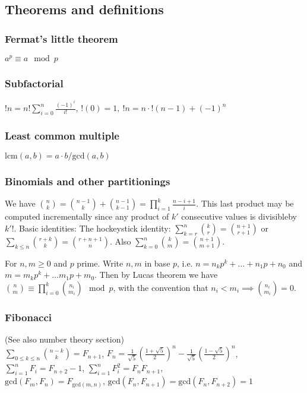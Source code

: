 \documentclass[
	a4paper,
	landscape,
	10pt,
]{article}
\begin{document}
	\subsection{Theorems and definitions}
		\subsubsection*{Fermat's little theorem}
		$a^p \equiv a \mod p$
		\subsubsection*{Subfactorial}
		$!n = n! \sum_{i=0}^{n} \frac{(-1)^i}{i!}$, 
		$!(0) = 1, ~ !n = n \cdot !(n-1) + (-1)^n$
		\subsubsection*{Least common multiple}
		$\text{lcm}(a, b) = a \cdot b / \text{gcd}(a, b)$

		\subsubsection*{Binomials and other partitionings}
		We have $\binom{n}{k} = \binom{n-1}{k}+\binom{n-1}{k-1} =
			\prod_{i=1}^k \frac{n-i+1}{i}$. This last product may be computed
		incrementally since any product of $k'$ consecutive values is divisibleby
		$k'!$.
		Basic identities: The hockeystick identity: $\sum_{k=r}^n \binom{k}{r}
			= \binom{n+1}{r+1}$
		or $\sum_{k\leq n}\binom{r+k}{k} = \binom{r+n+1}{n}$.
		Also $\sum_{k=0}^n \binom{k}{m} = \binom{n+1}{m+1}$.

		For $n, m \geq 0$ and $p$ prime. Write $n, m$ in base $p$, i.e.
		$n = n_k p^k + \dots + n_1 p + n_0$ and $m = m_k p^k + \dots m_1 p + m_0$. Then
		by Lucas theorem we have $\binom{n}{m} \equiv \prod_{i=0}^k \binom{n_i}{m_i}
		\mod p$, with the convention that $n_i < m_i \implies \binom{n_i}{m_i} =0$.

		\subsubsection*{Fibonacci} (See also number theory section) \\
 		$\sum_{0 \leq k \leq n} \binom{n-k}{k} = F_{n+1}$, 
		$F_n = \frac{1}{\sqrt{5}} \left(\frac{1+\sqrt{5}}{2}\right)^n - \frac{1}{\sqrt{5}}\left(\frac{1-\sqrt{5}}{2}\right)^n$, \\
		$\sum_{i=1}^{n} {F_i} = F_{n+2}-1$, $\sum_{i=1}^{n} {F_i^2} = F_{n}F_{n+1}$, \\
		$\text{gcd}(F_m, F_n) = F_{\text{gcd}(m, n)}$,
		$\text{gcd}(F_n, F_{n+1}) = \text{gcd}(F_n, F_{n+2}) = 1$
\end{document}

